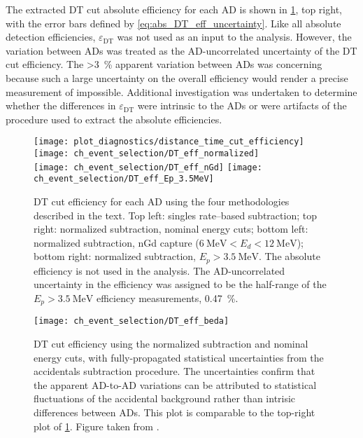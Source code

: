 The extracted DT cut absolute efficiency for each AD is shown in
\cref{fig:DT_eff}, top right, with the error bars defined by
\cref{eq:abs_DT_eff_uncertainty}.
Like all absolute detection efficiencies,
$\varepsilon_{\text{DT}}$ was not used as an input to the \thetaot{} analysis.
However, the variation between ADs was treated as the AD-uncorrelated uncertainty
of the DT cut efficiency.
The \SI{>3}{\percent} apparent variation between ADs
was concerning because such a large uncertainty on the overall efficiency
would render a precise measurement of \thetaot{} impossible.
Additional investigation was undertaken to
determine whether the differences in $\varepsilon_\text{DT}$ were intrinsic to the ADs
or were artifacts of the procedure
used to extract the absolute efficiencies.

\begin{figure}
    \centering
    \texttt{[image: plot\_diagnostics/distance\_time\_cut\_efficiency]}
    \texttt{[image: ch\_event\_selection/DT\_eff\_normalized]} \\
    \texttt{[image: ch\_event\_selection/DT\_eff\_nGd]}
    \texttt{[image: ch\_event\_selection/DT\_eff\_Ep\_3.5MeV]}
    \caption[DT cut efficiency study]{
        DT cut efficiency for each AD using the four methodologies
        described in the text.
        Top left: singles rate--based subtraction;
        top right: normalized subtraction, nominal energy cuts;
        bottom left: normalized subtraction, nGd capture
        ($\SI{6}{\MeV} < E_d < \SI{12}{\MeV}$);
        bottom right: normalized subtraction, $E_p > \SI{3.5}{\MeV}$.
        The absolute efficiency is not used in the \thetaot{} analysis.
        The AD-uncorrelated uncertainty in the efficiency
        was assigned to be the half-range of the $E_p > \SI{3.5}{\MeV}$
        efficiency measurements, \SI{0.47}{\percent}.
    }
    \label{fig:DT_eff}
\end{figure}

\begin{figure}
    \centering
    \texttt{[image: ch\_event\_selection/DT\_eff\_beda]}
    \caption[DT efficiency with full statistical uncertainty]{
        DT cut efficiency using the normalized subtraction
        and nominal energy cuts,
        with fully-propagated statistical uncertainties
        from the accidentals subtraction procedure.
        The uncertainties confirm that the apparent AD-to-AD variations
        can be attributed to statistical fluctuations of the accidental background
        rather than intrisic differences between ADs.
        This plot is comparable to the top-right plot of \cref{fig:DT_eff}.
        Figure taken from \cite{beda_DT_eff_unc}.
    }
    \label{fig:DT_eff_beda}
\end{figure}



